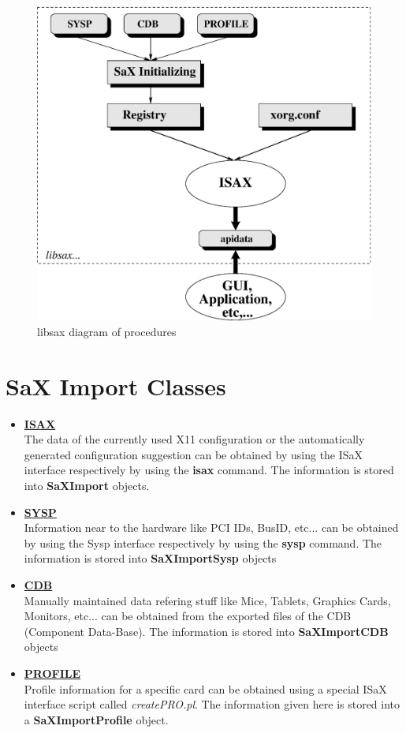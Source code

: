 \begin{figure}[h]
\centering
\includegraphics[scale=0.5]{figures/sax.eps}
\caption{libsax diagram of procedures}
\end{figure}

\section{SaX Import Classes}
\begin{itemize}
\item \textbf{\underline{ISAX}}\\
      The data of the currently used X11 configuration or the automatically
      generated configuration suggestion can be obtained by using the ISaX
      interface respectively by using the \textbf{isax} command. The
      information is stored into \textbf{SaXImport} objects.
\item \textbf{\underline{SYSP}}\\
      Information near to the hardware like PCI IDs, BusID, etc... can be
      obtained by using the Sysp interface respectively by using the
      \textbf{sysp} command. The information is stored into
      \textbf{SaXImportSysp} objects
\item \textbf{\underline{CDB}}\\
      Manually maintained data refering stuff like Mice, Tablets,
      Graphics Cards, Monitors, etc... can be obtained from the exported
      files of the CDB (Component Data-Base). The information is stored
      into \textbf{SaXImportCDB} objects
\item \textbf{\underline{PROFILE}}\\
      Profile information for a specific card can be obtained using a
      special ISaX interface script called \textit{createPRO.pl}. The
      information given here is stored into a \textbf{SaXImportProfile}
      object.
\end{itemize}

